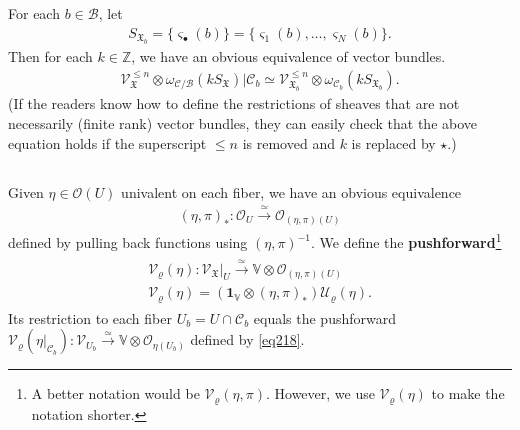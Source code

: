\documentclass[12pt,a4paper,notitlepage]{article}
\theoremstyle{definition}
\theoremstyle{plain}
\newcommand{\fk}{\mathfrak}
\newcommand{\mc}{\mathcal}
\newcommand{\id}{\mathbf{1}}
\newcommand{\scr}{\mathscr}
\newcommand{\sgm}{\varsigma}
\newcommand{\SX}{{S_{\fk X}}}
\newcommand{\blt}{\bullet}
\newcommand{\Vbb}{\mathbb V}
\newcommand{\Zbb}{\mathbb Z}
\newcommand{\SXb}{{S_{\fk X_b}}}
\numberwithin{equation}{section}
\begin{document}
For each $b\in\mc B$, let \index{SXb@$\SXb=\{\sgm_1(b),\dots,\sgm_N(b)\}$}
\begin{align}
\SXb=\{\sgm_\blt(b)\}=\{\sgm_1(b),\dots,\sgm_N(b)\}.
\end{align}
Then for each $k\in\Zbb$, we have an obvious equivalence of vector bundles.
\begin{align}
\scr V_{\fk X}^{\leq n}\otimes\omega_{\mc C/\mc B}(k\SX)\big|{\mc C_b}\simeq\scr V_{\fk X_b}^{\leq n}\otimes\omega_{\mc C_b}(k\SXb).
\end{align}
(If the readers know how to define the restrictions of sheaves that are not necessarily (finite rank) vector bundles, they can easily check that the above equation holds if the superscript $\leq n$ is removed and $k$ is replaced by $\star$.)



\subsection{}

Given $\eta\in\scr O(U)$ univalent on each fiber, we have an obvious equivalence
\begin{align}
(\eta,\pi)_*:\scr O_U\xrightarrow{\simeq}\scr O_{(\eta,\pi)(U)}
\end{align}
defined by pulling back functions using $(\eta,\pi)^{-1}$. We define the \textbf{pushforward}\footnote{A better notation would be $\mc V_\varrho(\eta,\pi)$. However, we use $\mc V_\varrho(\eta)$ to make the notation shorter.} \index{V@$\mc V_\varrho(\eta_i),\mc V_\varrho(\varphi)$}
\begin{gather}\label{eq233}
\begin{gathered}
\mc V_\varrho(\eta):\scr V_{\fk X}|_U\xrightarrow{\simeq}\Vbb\otimes\scr O_{(\eta,\pi)(U)}\\
\mc V_\varrho(\eta)=(\id_\Vbb\otimes(\eta,\pi)_*)\mc U_\varrho(\eta).
\end{gathered}
\end{gather}
Its restriction to each fiber $U_b=U\cap\mc C_b$ equals the pushforward $\mc V_\varrho(\eta|_{\mc C_b}):\scr V_{U_b}\xrightarrow{\simeq}\Vbb\otimes\scr O_{\eta(U_b)}$ defined by \eqref{eq218}.
\end{document}
